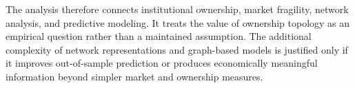 \noindent
The analysis therefore connects institutional ownership, market fragility, network analysis, and predictive modeling. It treats the value of ownership topology as an empirical question rather than a maintained assumption. The additional complexity of network representations and graph-based models is justified only if it improves out-of-sample prediction or produces economically meaningful information beyond simpler market and ownership measures.